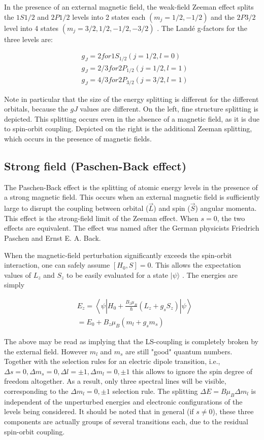 \documentclass[main.tex]{subfiles}
\newcommand{\mblock}[1]{ {\allowbreak $#1$ }}
\begin{document}
In the presence of an external magnetic field, the weak-field Zeeman effect splits the $1S1/2$ and $2P1/2$ levels into 2 states each \mblock{(m_j = 1/2, -1/2)} and the $2P3/2$ level into 4 states \mblock{(m_j = 3/2, 1/2, -1/2, -3/2)}. The Land\'e g-factors for the three levels are:

\begin{align*}
&g_J = 2 for 1S_{1/2} (j=1/2, l=0)\\
&g_J = 2/3 for 2P_{1/2} (j=1/2, l=1)\\
&g_J = 4/3 for 2P_{3/2} (j=3/2, l=1)
\end{align*}

Note in particular that the size of the energy splitting is different for the different orbitals, because the $gJ$ values are different. On the left, fine structure splitting is depicted. This splitting occurs even in the absence of a magnetic field, as it is due to spin-orbit coupling. Depicted on the right is the additional Zeeman splitting, which occurs in the presence of magnetic fields.

\subsection{Strong field (Paschen-Back effect)}

The Paschen-Back effect is the splitting of atomic energy levels in the presence of a strong magnetic field. This occurs when an external magnetic field is sufficiently large to disrupt the coupling between orbital ($\vec{L}$) and spin ($\vec{S}$) angular momenta. This effect is the strong-field limit of the Zeeman effect. When $s = 0$, the two effects are equivalent. The effect was named after the German physicists Friedrich Paschen and Ernst E. A. Back.

When the magnetic-field perturbation significantly exceeds the spin-orbit interaction, one can safely assume $[H_{0}, S] = 0$. This allows the expectation values of $L_{z}$ and $S_{z}$ to be easily evaluated for a state $|\psi\rangle$ . The energies are simply

\begin{align*}
&E_{z} = \left\langle \psi \left| H_{0} + \frac{B_{z}\mu_B}{\hbar}(L_{z}+g_{s}S_z) \right|\psi\right\rangle\\
&=E_{0} + B_z\mu_B (m_l + g_{s}m_s)
\end{align*} 

The above may be read as implying that the LS-coupling is completely broken by the external field. However $m_l$ and $m_s$ are still "good" quantum numbers. Together with the selection rules for an electric dipole transition, i.e., \mblock{\Delta s = 0, \Delta m_s = 0, \Delta l = \pm 1, \Delta m_l = 0, \pm 1} this allows to ignore the spin degree of freedom altogether. As a result, only three spectral lines will be visible, corresponding to the \mblock{\Delta m_l = 0, \pm 1} selection rule. The splitting \mblock{\Delta E = B \mu_B \Delta m_l} is independent of the unperturbed energies and electronic configurations of the levels being considered. It should be noted that in general (if $s \neq 0$), these three components are actually groups of several transitions each, due to the residual spin-orbit coupling.
\end{document}
